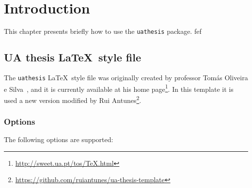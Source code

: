 \chapter{Introduction}
\label{c1}

This chapter presents briefly how to use the \verb+uathesis+ package.
fef

\section{UA thesis \LaTeX\ style file}
\label{c1:s:uathesis-style-file}

The \verb+uathesis+ \LaTeX\ style file was originally created by professor Tomás Oliveira e Silva~\parencite*{oliveiraesilva2012a}, and it is currently available at his home page\footnote{\url{http://sweet.ua.pt/tos/TeX.html}}.
In this template it is used a new version modified by Rui Antunes\footnote{\url{https://github.com/ruiantunes/ua-thesis-template}}.


\subsection{Options}
\label{c1:ss:options}

The following options are supported:

